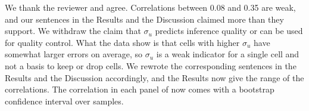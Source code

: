 \response
We thank the reviewer and agree. Correlations between 0.08 and 0.35 are weak, and our sentences in the Results and the Discussion claimed more than they support. We withdraw the claim that $\sigma_u$ predicts inference quality or can be used for quality control. What the data show is that cells with higher $\sigma_u$ have somewhat larger errors on average, so $\sigma_u$ is a weak indicator for a single cell and not a basis to keep or drop cells. We rewrote the corresponding sentences in the Results and the Discussion accordingly, and the Results now give the range of the correlations. The correlation in each panel of  now comes with a bootstrap confidence interval over samples.


